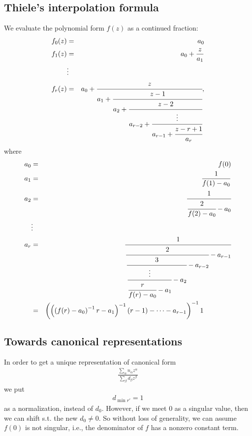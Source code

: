 \documentclass[11pt]{book}
\begin{document}
\subsection{Thiele's interpolation formula}
We evaluate the polynomial form $f(z)$ as a continued fraction:
\begin{eqnarray}
f_0(z) &=& a_0 \\
f_1(z) &=& a_0 + \frac{z}{a_1} \\
\nonumber
&\vdots& \\
f_r(z) &=& a_0 + \cfrac{z}{a_1 + \cfrac{z-1}{a_2 + \cfrac{z- 2}{a_{r-2} + \cfrac{\vdots}{a_{r-1} + \cfrac{z-r+1}{a_r}}}}},
\end{eqnarray}
where
\begin{eqnarray}
a_0 &=& f(0) \\
a_1 &=& \frac{1}{f(1) - a_0}\\
a_2 &=& \cfrac{1}{\cfrac{2}{f(2)-a_0} - a_0} \\
\nonumber
&\vdots& \\
a_r &=&\cfrac{1}{\cfrac{2}{\cfrac{3}{\cfrac{\vdots}{\cfrac{r}{f(r)-a_0}-a_1}-a_2} - a_{r-2}} - a_{r-1}} \\
&=& \left( \left( \left( f(r)-a_0 \right)^{-1} r - a_1 \right)^{-1} (r - 1) - \cdots - a_{r-1} \right)^{-1} 1 \qquad\qquad
\end{eqnarray}


\subsection{Towards canonical representations}
In order to get a unique representation of canonical form
\begin{eqnarray}
\frac{\sum_\alpha n_\alpha z^\alpha}{\sum_\beta d_\beta z^\beta}
\end{eqnarray}
we put
\begin{eqnarray}
d_{\min r'} = 1
\end{eqnarray}
as a normalization, instead of $d_0$.
However, if we meet 0 as a singular value, then we can shift s.t. the new $d_0 \neq 0$.
So without loss of generality, we can assume $f(0)$ is not singular, i.e., the denominator of $f$ has a nonzero constant term.
\end{document}
